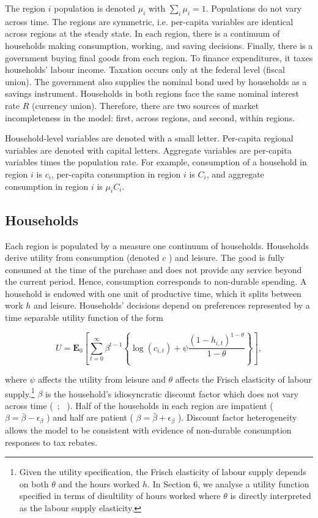 \documentclass[\latexroot/\projectname]{subfiles}
\begin{document}
The region $i$ population is denoted $\mu_{i}$ with $\sum_{i} \mu_{i}=1$. Populations do not vary across time. The regions are symmetric, i.e. per-capita variables are identical across regions at the steady state. In each region, there is a continuum of households making consumption, working, and saving decisions. Finally, there is a government buying final goods from each region. To finance expenditures, it taxes households' labour income. Taxation occurs only at the federal level (fiscal union). The government also supplies the nominal bond used by households as a savings instrument. Households in both regions face the same nominal interest rate $R$ (currency union). Therefore, there are two sources of market incompleteness in the model: first, across regions, and second, within regions.

Household-level variables are denoted with a small letter. Per-capita regional variables are denoted with capital letters. Aggregate variables are per-capita variables times the population rate. For example, consumption of a household in region $i$ is $c_{i}$, per-capita consumption in region $i$ is $C_{i}$, and aggregate consumption in region $i$ is $\mu_{i} C_{i}$.

\subsection{Households}
Each region is populated by a measure one continuum of households. Households derive utility from consumption (denoted $c$ ) and leisure. The good is fully consumed at the time of the purchase and does not provide any service beyond the current period. Hence, consumption corresponds to non-durable spending. A household is endowed with one unit of productive time, which it splits between work $h$ and leisure. Households' decisions depend on preferences represented by a time separable utility function of the form


\begin{equation*}
U=\mathbf{E}_{0}\left[\sum_{t=0}^{\infty} \beta^{t-1}\left\{\log \left(c_{i, t}\right)+\psi \frac{\left(1-h_{i, t}\right)^{1-\theta}}{1-\theta}\right\}\right], \tag{4.1}
\end{equation*}


where $\psi$ affects the utility from leisure and $\theta$ affects the Frisch elasticity of labour supply.\footnote{Given the utility specification, the Frisch elasticity of labour supply depends on both $\theta$ and the hours worked $h$. In Section 6, we analyse a utility function specified in terms of disultility of hours worked where $\theta$ is directly interpreted as the labour supply elasticity.} $\beta$ is the household's idiosyncratic discount factor which does not vary across time (~\cite{Krueger2016-kh}; ~\cite{Hagedorn2019-op}). Half of the households in each region are impatient ( $\beta= \bar{\beta}-\epsilon_{\beta}$ ) and half are patient ( $\beta=\bar{\beta}+\epsilon_{\beta}$ ). Discount factor heterogeneity allows the model to be consistent with evidence of non-durable consumption responses to tax rebates.
\end{document}
